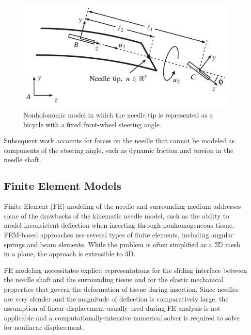 \begin{figure}[h]
\includegraphics[width=1.0\textwidth]{Fig/chap2/webster_nonholonomic_model.png}
\caption{Nonholonomic model in which the needle tip is represented as a bicycle with a fixed front-wheel steering angle\cite{webster_nonholonomic_2006}.}
\label{fig:webster_nonholonomic_model}
\end{figure}

Subsequent work accounts for forces on the needle that cannot be modeled as components of the steering angle, such as dynamic friction and torsion in the needle shaft\cite{reed*_modeling_2009, swensen_torsional_2014}.

\subsection{Finite Element Models}
Finite Element (FE) modeling of the needle and surrounding medium addresses some of the drawbacks of the kinematic needle model, such as the ability to model inconsistent deflection when inserting through nonhomogeneous tissue\cite{goksel_modeling_2009}. FEM-based approaches use several types of finite elements, including angular springs and beam elements. While the problem is often simplified as a 2D mesh in a plane, the approach is extensible to 3D\cite{chentanez_interactive_2009}.

FE modeling necessitates explicit representations for the sliding interface between the needle shaft and the surrounding tissue and for the elastic mechanical properties that govern the deformation of tissue during insertion\cite{dehghan_comparison_2006}. Since needles are very slender and the magnitude of deflection is comparatively large, the assumption of linear displacement usually used during FE analysis is not applicable and a computationally-intensive numerical solver is required to solve for nonlinear displacement.

